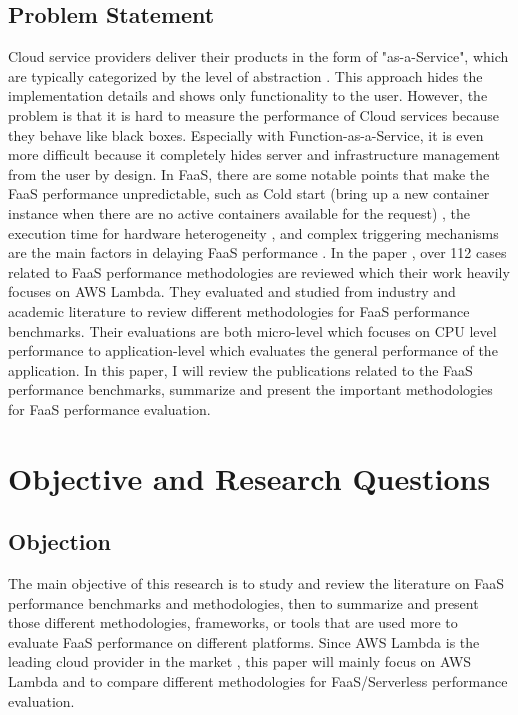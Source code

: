 \subsection{Problem Statement}
Cloud service providers deliver their products in the form of "as-a-Service", which are typically categorized by the level of abstraction \cite{pellegrini2019function}. This approach hides the implementation details and shows only functionality to the user. However, the problem is that it is hard to measure the performance of Cloud services because they behave like black boxes. Especially with Function-as-a-Service, it is even more difficult because it completely hides server and infrastructure management from the user by design. In FaaS, there are some notable points that make the FaaS performance unpredictable, such as Cold start (bring up a new container instance when there are no active containers available for the request) \cite{lopez2018comparison}, the execution time for hardware heterogeneity \cite{figiela2018performance}, and complex triggering mechanisms are the main factors in delaying FaaS performance \cite{chang2010optimal}. In the paper \cite{pellegrini2019function}, over 112 cases related to FaaS performance methodologies are reviewed which their work heavily focuses on AWS Lambda. They evaluated and studied from industry and academic literature to review different methodologies for FaaS performance benchmarks. Their evaluations are both micro-level which focuses on CPU level performance to application-level which evaluates the general performance of the application.
In this paper, I will review the publications related to the FaaS performance benchmarks, summarize and present the important methodologies for FaaS performance evaluation.

%

%
\section{Objective and Research Questions}
\label{sec:objective-and-research-questions}

\subsection{Objection}
The main objective of this research is to study and review the literature on FaaS performance benchmarks and methodologies, then to summarize and present those different methodologies, frameworks, or tools that are used more to evaluate FaaS performance on different platforms. Since AWS Lambda is the leading cloud provider in the market \cite{scheuner2020state}, this paper will mainly focus on AWS Lambda and to compare different methodologies for FaaS/Serverless performance evaluation.

